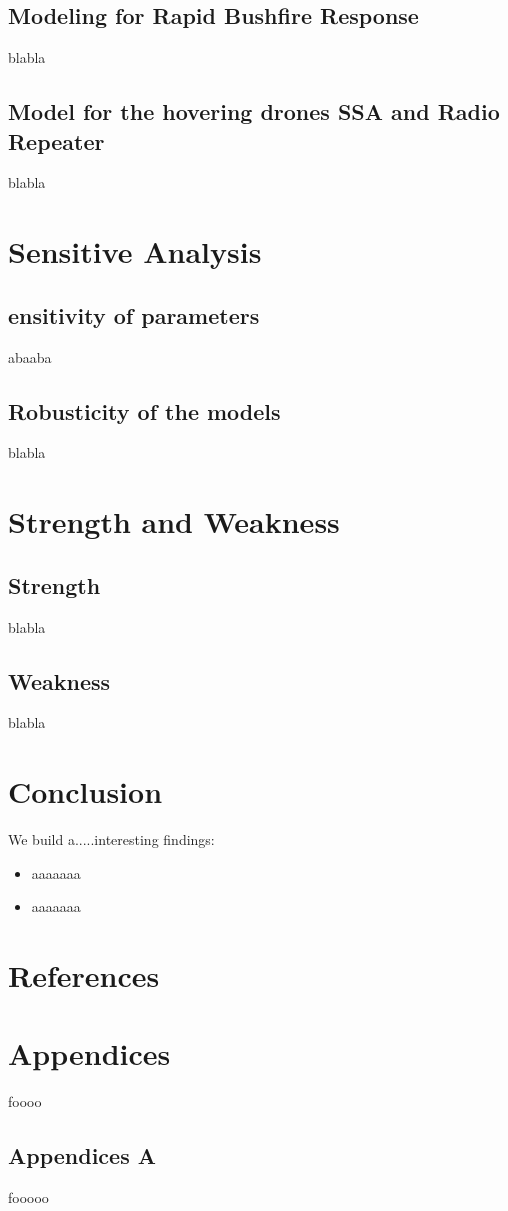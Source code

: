 \documentclass[13pt]{ctexart} %
\begin{document}
\subsection{Modeling for Rapid Bushfire Response}
blabla

\subsection{Model for the hovering drones SSA and Radio Repeater}
blabla

\section{Sensitive Analysis}
\subsection{ensitivity of parameters}
abaaba
\subsection{Robusticity of the models}
blabla
\section{Strength and Weakness}
\subsection{Strength}
blabla

\subsection{Weakness}
blabla

\section{Conclusion}
We build a.....interesting findings:

\begin{itemize}
    \item aaaaaaa
    \item aaaaaaa
\end{itemize}

\newpage
\section*{References}
\fancyhf{}
\fancyhead[R]{ }
\fancyhead[L]{ }

\Large

\newpage
\section*{Appendices}
\fontsize{13pt}{12.5pt}\selectfont
foooo
\vspace{7pt}
\subsection*{Appendices A}
fooooo
\end{document}
